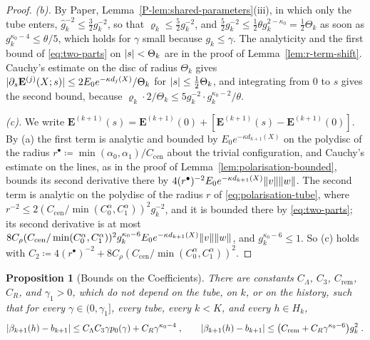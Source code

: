 \documentclass[11pt]{preprint}
\DeclarePairedDelimiter{\abs}{\lvert}{\rvert}
\DeclarePairedDelimiter{\norm}{\lVert}{\rVert}
\numberwithin{equation}{section}
\newtheorem{proposition}{Proposition}
\theoremstyle{definition}
\theoremstyle{remark}
\theoremstyle{plain}
\begin{document}
\begin{proof}
\emph{(b).} By Paper, Lemma~\ref{P-lem:shared-parameters}(iii), in which only the tube enters, $\hat g_k^{-2} \leq \frac32g_k^{-2}$, so that $\varrho_k \leq \frac52g_k^{-2}$, and $\frac52g_k^{-2} \leq \frac12\theta g_k^{2-\kappa_0} = \frac12\Theta_k$ as soon as $g_k^{\kappa_0-4} \leq \theta/5$, which holds for $\gamma$ small because $g_k \leq \gamma$. The analyticity and the first bound of \eqref{eq:two-parts} on $\abs s < \Theta_k$ are in the proof of Lemma~\ref{lem:r-term-shift}. Cauchy's estimate on the disc of radius $\Theta_k$ gives $\abs{\partial_s\mathbf E^{(j)}(X; s)} \leq 2E_0e^{-\kappa d_j(X)}/\Theta_k$ for $\abs s \leq \frac12\Theta_k$, and integrating from $0$ to $s$ gives the second bound, because $\varrho_k \cdot 2/\Theta_k \leq 5g_k^{-2} \cdot g_k^{\kappa_0-2}/\theta$.

\emph{(c).} We write $\mathbf E^{(k+1)}(s) = \mathbf E^{(k+1)}(0) + [\mathbf E^{(k+1)}(s) - \mathbf E^{(k+1)}(0)]$. By (a) the first term is analytic and bounded by $E_0e^{-\kappa d_{k+1}(X)}$ on the polydisc of the radius $r^\bullet \coloneqq \min(\alpha_0, \alpha_1)/C_{\mathrm{cen}}$ about the trivial configuration, and Cauchy's estimate on the lines, as in the proof of Lemma~\ref{lem:polarisation-bounded}, bounds its second derivative there by $4(r^\bullet)^{-2}E_0e^{-\kappa d_{k+1}(X)}\norm v\norm w$. The second term is analytic on the polydisc of the radius $r$ of \eqref{eq:polarisation-tube}, where $r^{-2} \leq 2(C_{\mathrm{cen}}/\min(C^\alpha_0, C^\alpha_1))^2g_k^{-2}$, and it is bounded there by \eqref{eq:two-parts}; its second derivative is at most $8C_\rho(C_{\mathrm{cen}}/\min(C^\alpha_0, C^\alpha_1))^2g_k^{\kappa_0-6}E_0e^{-\kappa d_{k+1}(X)}\norm v\norm w$, and $g_k^{\kappa_0-6} \leq 1$. So (c) holds with $C_2 \coloneqq 4(r^\bullet)^{-2} + 8C_\rho(C_{\mathrm{cen}}/\min(C^\alpha_0, C^\alpha_1))^2$.
\end{proof}

\begin{proposition}[Bounds on the Coefficients]\label{prop:coefficient-bounds}
There are constants $C_\Lambda$, $C_3$, $C_{\mathrm{rem}}$, $C_R$, and $\gamma_1 > 0$, which do not depend on the tube, on $k$, or on the history, such that for every $\gamma \in (0, \gamma_1]$, every tube, every $k < K$, and every $h \in H_k$,
\begin{equation}\label{eq:coefficient-bounds}
    \abs{\beta_{k+1}(h) - b_{k+1}} \leq C_\Lambda C_3\gamma p_0(\gamma) + C_R\gamma^{\kappa_0-4}\;,
    \qquad
    \abs{\beta_{k+1}(h) - b_{k+1}} \leq \bigl(C_{\mathrm{rem}} + C_R\gamma^{\kappa_0-6}\bigr)g_k^2\;.
\end{equation}
\end{proposition}
\end{document}
